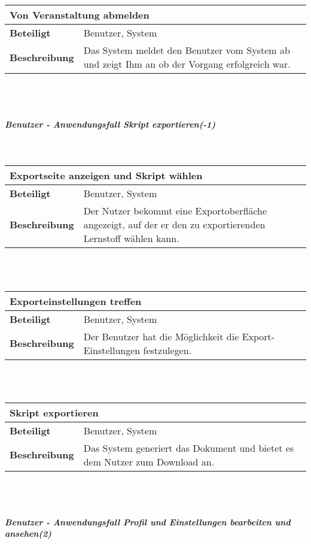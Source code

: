 \documentclass[12pt,a4paper]{article}
\begin{document}
\begin{tabular}{l p{10cm}}
\multicolumn{2}{l}{\textbf{Von Veranstaltung abmelden}} \\ \hline
\textbf{Beteiligt} & Benutzer, System \\ \hline 
\textbf{Beschreibung} & Das System meldet den Benutzer vom System ab und zeigt Ihm an ob der Vorgang erfolgreich war.\\ 
\hline 
\end{tabular}\\\\
\subparagraph{Benutzer - Anwendungsfall \glqq Skript exportieren\grqq (-1)}\mbox{}\\

\begin{tabular}{l p{10cm}}
\multicolumn{2}{l}{\textbf{Exportseite anzeigen und Skript wählen}} \\ \hline
\textbf{Beteiligt} & Benutzer, System \\ \hline 
\textbf{Beschreibung} & Der Nutzer bekommt eine Exportoberfläche angezeigt, auf der er den zu exportierenden Lernstoff wählen kann.\\ 
\hline 
\end{tabular}\\\\

\begin{tabular}{l p{10cm}}
\multicolumn{2}{l}{\textbf{Exporteinstellungen treffen}} \\ \hline
\textbf{Beteiligt} & Benutzer, System \\ \hline 
\textbf{Beschreibung} & Der Benutzer hat die Möglichkeit die Export-Einstellungen festzulegen.\\ 
\hline 
\end{tabular}\\\\

\begin{tabular}{l p{10cm}}
\multicolumn{2}{l}{\textbf{Skript exportieren}} \\ \hline
\textbf{Beteiligt} & Benutzer, System \\ \hline 
\textbf{Beschreibung} & Das System generiert das Dokument und bietet es dem Nutzer zum Download an.\\ 
\hline 
\end{tabular}\\\\
\subparagraph{Benutzer - Anwendungsfall \glqq Profil und Einstellungen bearbeiten und ansehen\grqq  (2)}\mbox{}\\
\end{document}
